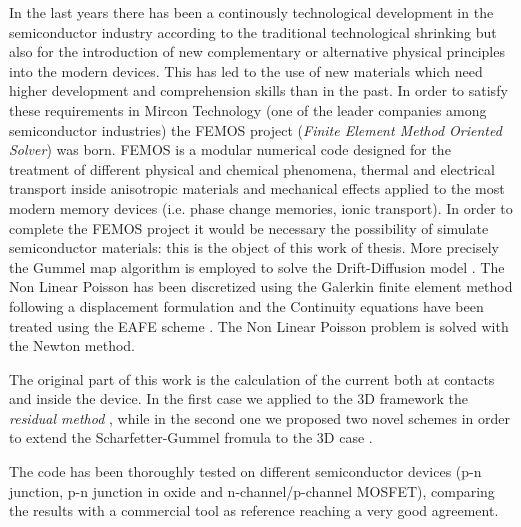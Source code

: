 In the last years there has been a continously technological development in the semiconductor industry according to the traditional technological shrinking but also for the introduction of new complementary or alternative physical principles into the modern devices.
This has led to the use of new materials which need higher development and comprehension skills than in the past. In order to satisfy these requirements in Mircon Technology (one of the leader companies among semiconductor industries) the FEMOS project (\textit{Finite Element Method Oriented Solver}) was born.
FEMOS is a modular numerical code designed for the treatment of different physical and chemical phenomena, thermal and electrical transport inside anisotropic materials and mechanical effects applied to the most modern memory devices (i.e. phase change memories, ionic transport). In order to complete the FEMOS project it would be necessary the possibility of simulate semiconductor materials: this is the object of this work of thesis.
More precisely the Gummel map algorithm \cite{GummelMap} is employed to solve the Drift-Diffusion model  \cite{Jackson:ElettroClassica}. The Non Linear Poisson has been discretized using the Galerkin finite element method \cite{quarteroni:NumApprox} following a displacement formulation and the Continuity equations have been treated using the EAFE scheme \cite{Zikatanov:EAFE1}. The Non Linear Poisson problem is solved with the Newton method.

The original part of this work is the calculation of the current both at contacts and inside the device. In the first case we applied to the 3D framework the \textit{residual method} \cite{ContactCurrentRM}, while in the second one we proposed two novel schemes in order to extend the Scharfetter-Gummel fromula to the 3D case \cite{Gummel:SignAnalys}.

The code has been thoroughly tested on different semiconductor devices (p-n junction, p-n junction in oxide and n-channel/p-channel MOSFET), comparing the results with a commercial tool as reference reaching a very good agreement.
\vspace{1cm}

